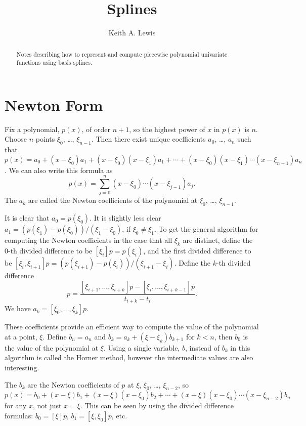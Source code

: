\documentclass[11pt,fleqn]{article}
\begin{document}
\title{Splines}
\author{Keith A. Lewis}
\maketitle

\begin{abstract}
Notes describing how to represent and compute piecewise polynomial
univariate functions using basis splines.
\end{abstract}

\section{Newton Form}
Fix a polynomial, $p(x)$, of order $n + 1$, so the highest power of $x$
in $p(x)$ is $n$. Choose $n$ points $\xi_0$, \dots, $\xi_{n-1}$. Then
there exist unique coefficients $a_0$, \dots, $a_n$ such that
$p(x) = a_0 + (x - \xi_0)a_1 + (x - \xi_0)(x - \xi_1)a_1 + \cdots
 + (x - \xi_0)(x - \xi_1)\cdots(x - \xi_{n-1})a_n$.
We can also write this formula as
\begin{equation}
p(x) = \sum_{j=0}^n(x - \xi_0)\cdots(x - \xi_{j-1})a_j.
\end{equation}
The $a_k$ are called the Newton coefficients of the polynomial at $\xi_0$,
\dots, $\xi_{n-1}$.

It is clear that $a_0 = p(\xi_0)$. It is slightly less clear $a_1 =
(p(\xi_1) - p(\xi_0))/(\xi_1 - \xi_0)$, if $\xi_0\not=\xi_1$.  To get
the general algorithm for computing the Newton coefficients in the case
that all $\xi_k$ are distinct, define the 0-th divided difference
to be $[\xi_i]p = p(\xi_i)$, and the first divided difference to be
$[\xi_i,\xi_{i+1}]p = (p(\xi_{i+1}) - p(\xi_i))/(\xi_{i+1} - \xi_i)$.
Define the $k$-th divided difference
\begin{equation}
[\xi_i,\dots,\xi_{i+k}]p = \frac{[\xi_{i+1},\dots,\xi_{i+k}]p
	- [\xi_{i},\dots,\xi_{i+k - 1}]p}{t_{i+k} - t_i}.
\end{equation}
We have $a_k = [\xi_0,\dots,\xi_k]p$.

These coefficients provide an efficient way to compute the value of
the polynomial at a point, $\xi$.  Define $b_n = a_n$ and $b_k = a_k +
(\xi - \xi_k)b_{k+1}$ for $k < n$, then $b_0$ is the value of the
polynomial at $\xi$.  Using a single variable, $b$, instead of $b_k$
in this algorithm is called the Horner method, however the intermediate
values are also interesting.

The $b_k$ are the Newton coefficients of $p$ at $\xi$, $\xi_0$, \dots,
$\xi_{n-2}$, so $p(x) = b_0 + (x - \xi)b_1 + (x - \xi)(x - \xi_0)b_2 +
\cdots + (x - \xi)(x - \xi_0)\cdots(x - \xi_{n - 2})b_n$ for any $x$,
not just $x = \xi$. This can be seen by using the divided difference
formulas: $b_0 = [\xi]p$, $b_1 = [\xi, \xi_0]p$, etc.
\end{document}
